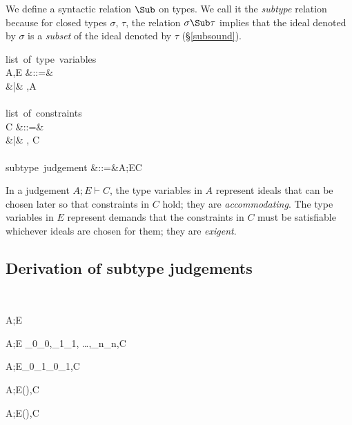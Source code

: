 \documentclass{amsart}
\theoremstyle{definition}
\begin{document}
We define a syntactic relation $\Sub$ on types. We call it the
\emph{subtype} relation because for closed types $\sigma$,
$\tau$, the relation $\sigma \Sub \tau$ implies that the ideal
denoted by $\sigma$ is a \emph{subset} of the ideal denoted by
$\tau$ (\S\ref{subsound}).
\begin{syntax}
\mbox{list of type variables}\\
A,E
&::=& \emptyset \\
&|& \alpha,A
\\
\\
\mbox{list of constraints}\\
C
&::=& \emptyset \\
&|& \sigma \Sub \tau, C
\\
\\
\mbox{subtype judgement}
&::=&A;E\vdash C
\end{syntax}%
In a judgement $A;E\vdash C$, the type variables in $A$ represent
ideals that can be chosen later so that constraints in $C$ hold;
they are \emph{accommodating}. The type variables in $E$
represent demands that the constraints in $C$ must be satisfiable
whichever ideals are chosen for them; they are \emph{exigent}.

\subsection{Derivation of subtype judgements}~

\infrule[S-vacuous]
{}
{A;E\vdash\emptyset}

{A;E \vdash \tau_0\Sub\tau_0,\tau_1\Sub\tau_1,
\ldots,\tau_n\Sub\tau_n,C}

{A;E\vdash\sigma_0\R\sigma_1\Sub\tau_0\R\tau_1,C}


{A;E\vdash(\All\alpha\sigma)\Sub\tau,C}

{A;E\vdash\sigma\Sub(\All\alpha\tau),C}
\end{document}
